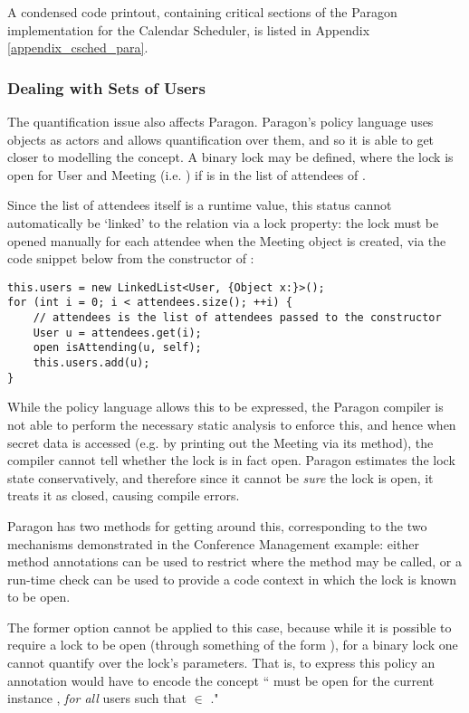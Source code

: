 A condensed code printout, containing critical sections of the Paragon implementation for the Calendar Scheduler, is listed in Appendix \ref{appendix_csched_para}.

\subsubsection{Dealing with Sets of Users}

The quantification issue also affects Paragon. Paragon's policy language uses objects as actors and allows quantification over them, and so it is able to get closer to modelling the concept. A binary lock  may be defined, where the lock is open for User  and Meeting  (i.e. ) if  is in the list of attendees of .

Since the list of attendees itself is a runtime value, this status cannot automatically be `linked' to the relation via a lock property: the lock must be opened manually for each attendee when the Meeting object is created, via the code snippet below from the constructor of :

\begin{verbatim}
this.users = new LinkedList<User, {Object x:}>();
for (int i = 0; i < attendees.size(); ++i) {
	// attendees is the list of attendees passed to the constructor
	User u = attendees.get(i);
	open isAttending(u, self);
	this.users.add(u);
} 
\end{verbatim}

While the policy language allows this to be expressed, the Paragon compiler is not able to perform the necessary static analysis to enforce this, and hence when secret data is accessed (e.g. by printing out the Meeting via its  method), the compiler cannot tell whether the lock is in fact open. Paragon estimates the lock state conservatively, and therefore since it cannot be \textit{sure} the lock is open, it treats it as closed, causing compile errors.

Paragon has two methods for getting around this, corresponding to the two mechanisms demonstrated in the Conference Management example: either method annotations can be used to restrict where the method may be called, or a run-time check can be used to provide a code context in which the lock is known to be open.

The former option cannot be applied to this case, because while it is possible to require a lock to be open (through something of the form ), for a binary lock one cannot quantify over the lock's parameters. That is, to express this policy an annotation would have to encode the concept `` must be open for the current instance , \textit{for all} users  such that  $ \in $ ."

